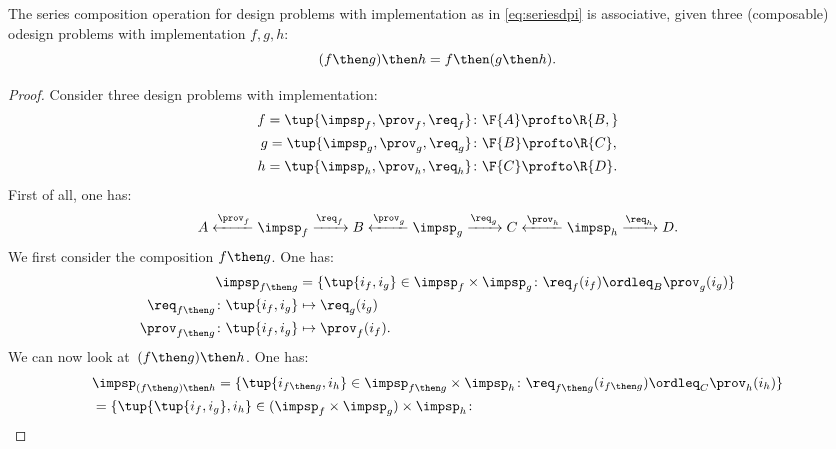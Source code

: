 \begin{lemma}
	The series composition operation for design problems with implementation as in \cref{eq:seriesdpi} is associative, \ie  given three (composable) odesign problems with implementation $f,g,h$:
	\begin{equation}
		(f\then g)
		\then h = f\then (g\then h).
	\end{equation}
\end{lemma}
\begin{proof}
	Consider three design problems with implementation:
	\begin{equation}
		\begin{aligned}
			f=\tup{{\impsp_f, \prov_f, \req_f} } & \colon \F{A} \profto\R{B,}  \\
			g=\tup{\impsp_g, \prov_g, \req_g}    & \colon \F{B} \profto \R{C}, \\
			h=\tup{\impsp_h, \prov_h, \req_h}    & \colon \F{C} \profto \R{D}.
		\end{aligned}
	\end{equation}
	First of all, one has:
	\begin{equation}
		A \xleftarrow{\prov_f} \impsp_f \xrightarrow{\req_f} B
		\xleftarrow{\prov_g} \impsp_g \xrightarrow{\req_g} C
		\xleftarrow{\prov_h} \impsp_h \xrightarrow{\req_h} D.
	\end{equation}
	We first consider the composition $f\then g$.
	One has:
	\begin{equation}
		\begin{aligned}
			\impsp_{f\then g}                       & = \{
			\tup{i_f,i_g} \in \impsp_f \times \impsp_g \colon
			\req_f(i_f) \ordleq_{B} \prov_g(i_g)
			\}                                                              \\
			\req_{f\then g}  \colon  \tup{i_f,i_g}  & \mapsto \req_g(i_g)   \\
			\prov_{f\then g}  \colon  \tup{i_f,i_g} & \mapsto \prov_f(i_f).
		\end{aligned}
	\end{equation}
	We can now look at~$(f\then g)\then h$.
	One has:
	\begin{equation}
		\begin{aligned}
			 & \impsp_{(f\then g)\then h} = \{
			\tup{i_{f\then g},i_h} \in \impsp_{f\then g} \times \impsp_{h}\colon
			\req_{f\then g}(i_{f\then g}) \ordleq_{C} \prov_h(i_h)
			\}                                 \\
			 & =\{
			\tup{\tup{i_f, i_g},i_h} \in (\impsp_f \times \impsp_g) \times \impsp_{h}\colon

\end{aligned}
\end{equation}
\end{proof}

